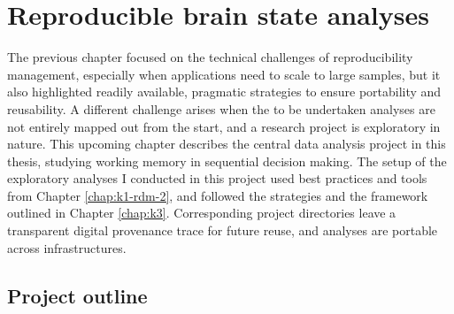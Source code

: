 

\chapter{Reproducible brain state analyses}
\label{chap:k4}

The previous chapter focused on the technical challenges of reproducibility management, especially when applications need to scale to large samples, but it also highlighted readily available, pragmatic strategies to ensure portability and reusability.
A different challenge arises when the to be undertaken analyses are not entirely mapped out from the start, and a research project is exploratory in nature.
This upcoming chapter describes the central data analysis project in this thesis, studying working memory in sequential decision making.
The setup of the exploratory analyses I conducted in this project used best practices and tools from Chapter \ref{chap:k1-rdm-2}, and followed the strategies and the framework outlined in Chapter \ref{chap:k3}.
Corresponding project directories leave a transparent digital provenance trace for future reuse, and analyses are portable across infrastructures.

\section{Project outline}

